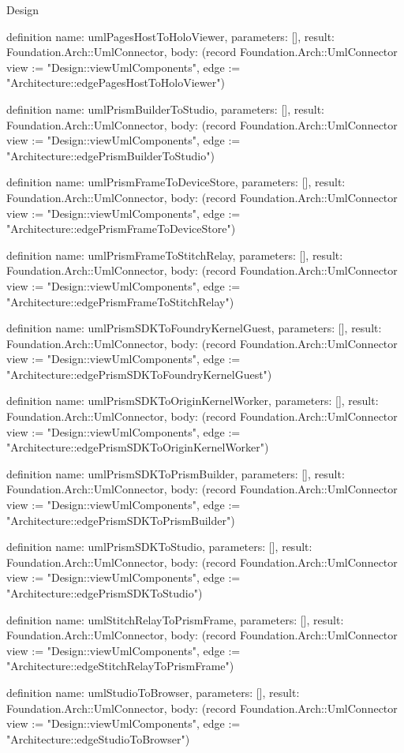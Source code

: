 \begin{lexlean}{Design}
\begin{semanticmodule}
definition{
  name: umlPagesHostToHoloViewer,
  parameters: [],
  result: Foundation.Arch::UmlConnector,
  body: (record Foundation.Arch::UmlConnector {view := "Design::viewUmlComponents", edge := "Architecture::edgePagesHostToHoloViewer"})
}

definition{
  name: umlPrismBuilderToStudio,
  parameters: [],
  result: Foundation.Arch::UmlConnector,
  body: (record Foundation.Arch::UmlConnector {view := "Design::viewUmlComponents", edge := "Architecture::edgePrismBuilderToStudio"})
}

definition{
  name: umlPrismFrameToDeviceStore,
  parameters: [],
  result: Foundation.Arch::UmlConnector,
  body: (record Foundation.Arch::UmlConnector {view := "Design::viewUmlComponents", edge := "Architecture::edgePrismFrameToDeviceStore"})
}

definition{
  name: umlPrismFrameToStitchRelay,
  parameters: [],
  result: Foundation.Arch::UmlConnector,
  body: (record Foundation.Arch::UmlConnector {view := "Design::viewUmlComponents", edge := "Architecture::edgePrismFrameToStitchRelay"})
}

definition{
  name: umlPrismSDKToFoundryKernelGuest,
  parameters: [],
  result: Foundation.Arch::UmlConnector,
  body: (record Foundation.Arch::UmlConnector {view := "Design::viewUmlComponents", edge := "Architecture::edgePrismSDKToFoundryKernelGuest"})
}

definition{
  name: umlPrismSDKToOriginKernelWorker,
  parameters: [],
  result: Foundation.Arch::UmlConnector,
  body: (record Foundation.Arch::UmlConnector {view := "Design::viewUmlComponents", edge := "Architecture::edgePrismSDKToOriginKernelWorker"})
}

definition{
  name: umlPrismSDKToPrismBuilder,
  parameters: [],
  result: Foundation.Arch::UmlConnector,
  body: (record Foundation.Arch::UmlConnector {view := "Design::viewUmlComponents", edge := "Architecture::edgePrismSDKToPrismBuilder"})
}

definition{
  name: umlPrismSDKToStudio,
  parameters: [],
  result: Foundation.Arch::UmlConnector,
  body: (record Foundation.Arch::UmlConnector {view := "Design::viewUmlComponents", edge := "Architecture::edgePrismSDKToStudio"})
}

definition{
  name: umlStitchRelayToPrismFrame,
  parameters: [],
  result: Foundation.Arch::UmlConnector,
  body: (record Foundation.Arch::UmlConnector {view := "Design::viewUmlComponents", edge := "Architecture::edgeStitchRelayToPrismFrame"})
}

definition{
  name: umlStudioToBrowser,
  parameters: [],
  result: Foundation.Arch::UmlConnector,
  body: (record Foundation.Arch::UmlConnector {view := "Design::viewUmlComponents", edge := "Architecture::edgeStudioToBrowser"})
}


\end{semanticmodule}
\end{lexlean}
